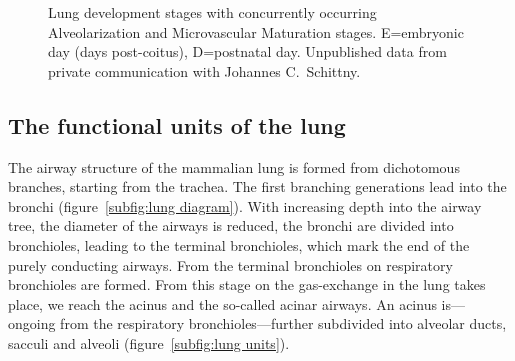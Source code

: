 \begin{figure}[htb]
	\noindent\makebox[\textwidth]{%
		\centering%
		}%
	\caption[Lung development stages]{Lung development stages with concurrently occurring Alveolarization and Microvascular Maturation stages. E=embryonic day (days post-coitus), D=postnatal day. Unpublished data from private communication with Johannes C.\ Schittny.}
	\label{fig:lung development stages new}
\end{figure}

\subsection{The functional units of the lung}
The airway structure of the mammalian lung is formed from dichotomous branches, starting from the trachea. The first branching generations lead into the bronchi (figure~\ref{subfig:lung diagram}). With increasing depth into the airway tree, the diameter of the airways is reduced, the bronchi are divided into bronchioles, leading to the terminal bronchioles, which mark the end of the purely conducting airways. From the terminal bronchioles on respiratory bronchioles are formed. From this stage on the gas-exchange in the lung takes place, we reach the acinus and the so-called acinar airways. An acinus is---ongoing from the respiratory bronchioles---further subdivided into alveolar ducts, sacculi and alveoli (figure~\ref{subfig:lung units}).

